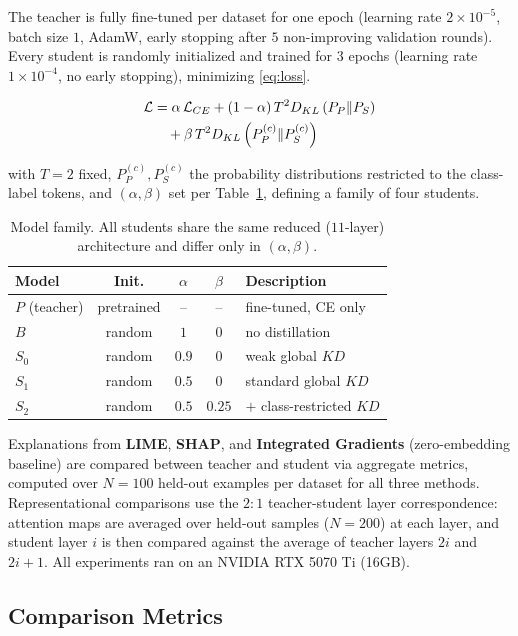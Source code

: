 \documentclass[conference]{IEEEtran}
\begin{document}
The teacher is fully fine-tuned per dataset for one epoch (learning rate $2\times10^{-5}$, batch size $1$, AdamW, early stopping after $5$ non-improving validation rounds). Every student is randomly initialized and trained for $3$ epochs (learning rate $1\times10^{-4}$, no early stopping), minimizing \eqref{eq:loss}.

\begin{align}
\mathcal{L} &= \alpha\,\mathcal{L}_{CE} + (1-\alpha)\,T^2 D_{KL}\left(P_P \Vert P_S\right) \notag \\
&\quad + \beta\,T^2 D_{KL}\left(P_P^{(c)} \Vert P_S^{(c)}\right)
\label{eq:loss}
\end{align}

with $T=2$ fixed, $P_P^{(c)},P_S^{(c)}$ the probability distributions restricted to the class-label tokens, and $(\alpha,\beta)$ set per Table~\ref{tab:model_family}, defining a family of four students.

\begin{table}[bp]
\centering
\caption{Model family. All students share the same reduced ($11$-layer) architecture and differ only in $(\alpha,\beta)$.}
\small
\begin{tabular}{|l|c|c|c|l|}
\hline
Model & Init. & $\alpha$ & $\beta$ & Description \\ \hline
$P$ (teacher) & pretrained & -- & -- & fine-tuned, CE only \\
$B$ & random & $1$ & $0$ & no distillation \\
$S_0$ & random & $0.9$ & $0$ & weak global $KD$ \\
$S_1$ & random & $0.5$ & $0$ & standard global $KD$ \\
$S_2$ & random & $0.5$ & $0.25$ & $+$ class-restricted $KD$ \\ \hline
\end{tabular}
\label{tab:model_family}
\end{table}

Explanations from \textbf{LIME}, \textbf{SHAP}, and \textbf{Integrated Gradients} (zero-embedding baseline) are compared between teacher and student via aggregate metrics, computed over $N=100$ held-out examples per dataset for all three methods. Representational comparisons use the $2{:}1$ teacher-student layer correspondence: attention maps are averaged over held-out samples ($N=200$) at each layer, and student layer $i$ is then compared against the average of teacher layers $2i$ and $2i+1$. All experiments ran on an NVIDIA RTX 5070 Ti (16GB).

\subsection{Comparison Metrics}\label{sec:metrics}
\end{document}
